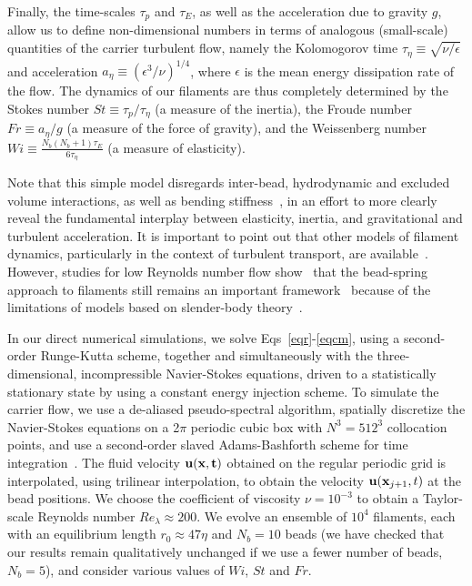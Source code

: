 \documentclass[aps,prl,twocolumn,superscriptaddress,floatfix,tightenlines,showpacs,notitlepage]{revtex4-1}
\begin{document}
Finally, the time-scales $\tau_p$
and $\tau_E$, as well as the acceleration due to gravity $g$,
allow us to define non-dimensional numbers in terms of analogous
(small-scale) quantities of the carrier turbulent flow, namely the Kolomogorov
time $\tau_\eta \equiv \sqrt{\nu/\epsilon}$ and acceleration
$a_\eta \equiv \left ({\epsilon^3}/{\nu}\right )^{1/4}$, where $\epsilon$
is the mean energy dissipation rate of the flow. The dynamics of our filaments
are thus completely determined by the
Stokes number $St \equiv \tau_p/\tau_\eta$ (a measure
of the inertia), the Froude number $Fr \equiv {a_\eta}/{g}$ (a measure of
the force of gravity), and the Weissenberg number $Wi \equiv \frac{N_b(N_b+1)\tau_E}{6\tau_\eta}$ (a measure of elasticity).  

Note that this simple model disregards inter-bead, hydrodynamic and 
excluded volume interactions, as well as bending stiffness~\citep{RoyalChains},
in an effort to more clearly reveal the
 fundamental interplay between elasticity, inertia, 
 and gravitational and turbulent acceleration. It is important to point
out that other models of filament dynamics, particularly in the context of
turbulent transport, are available~\cite{Brouzet_polymer,Verhille_3dconf_fiber,Brandt_fiber,Bec_Chain}.
However, studies for low Reynolds number flow show~\cite{Marchetti} that the
bead-spring approach to filaments still remains an important
framework~\cite{FilamentPRL,Schlagberger,Llopis,Delmotte} because of the
limitations of models based on slender-body theory~\cite{cox_1970,Xu}.

In our direct numerical simulations, we solve
Eqs~\eqref{eqr}-\eqref{eqcm}, using a
second-order Runge-Kutta scheme, together and simultaneously with the
three-dimensional, incompressible Navier-Stokes equations, driven to a
statistically stationary state by using a constant energy injection scheme. To simulate the carrier flow, we use
a de-aliased pseudo-spectral algorithm, spatially discretize the
Navier-Stokes equations on a 2$\pi$ periodic cubic box with $N^3 = 512^3$
collocation points, and use a second-order slaved Adams-Bashforth scheme for
time integration~\cite{James17}. The fluid velocity $\bf{u}({\bf x},t)$ obtained on the
regular periodic grid is interpolated, using trilinear interpolation,
to obtain the velocity ${\bf u}({\bf x}_{j+1},t)$ at the bead positions.
We choose the coefficient of viscosity $\nu = 10^{-3}$ to obtain a Taylor-scale 
Reynolds number $Re_\lambda \approx 200$. We evolve an ensemble of $10^4$ filaments, each with an equilibrium length 
$r_0 \approx 47\eta$ and $N_b = 10$ beads (we have checked that our results remain qualitatively
unchanged if we use a fewer number of beads, $N_b = 5$), and consider various values of $Wi$, $St$ and $Fr$. 
\end{document}
